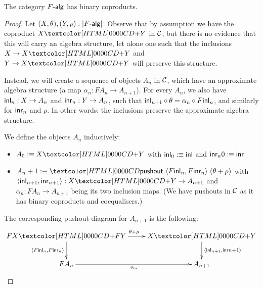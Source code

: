 \begin{proposition}
  The category $\algcat{F}$ has binary coproducts.
\end{proposition}

\begin{proof}
  Let $(X,\theta),(Y,\rho) : | \algcat{F} |$. Observe that by
  assumption we have the coproduct $\coproduct{X}{Y}$ in $\mathcal{C}$, but there is no
  evidence that this will carry an algebra structure, let alone one
  such that the inclusions $X \to \coproduct{X}{Y}$ and $Y \to \coproduct{X}{Y}$ will
  preserve this structure.

  Instead, we will create a sequence of objects $A_n$ in $\mathcal{C}$, which
  have an approximate algebra structure (a map
  $\alpha_n : FA_n \to A_{n+1}$). For every $A_n$, we also have
  $\inln{n} : X \to A_n$ and $\inrn{n} : Y \to A_n$, such that
  $\inln{n+1} \circ \theta = \alpha_n \circ F \inl_{n}$, and similarly
  for $\inrn{n}$ and $\rho$. In other words: the inclusions preserve
  the approximate algebra structure.

  We define the objects $A_n$ inductively:
  \begin{itemize}
  \item $A_0 \ddefeq \coproduct{X}{Y}$ with $\inln{0} \ddefeq \ident{inl}$ and $\inrn{n}{0} \ddefeq \ident{inr}$
  \item
    $A_n+1 \ddefeq \pushout{\langle F \inln{n}, F \inrn{n}
      \rangle}{(\theta + \rho)}$
    with
    $\langle \inln{n+1}, \inrn{n+1} \rangle : \coproduct{X}{Y} \to
    A_{n+1}$
    and $\alpha_n : FA_n \to A_{n+1}$ being its two inclusion
    maps. (We have pushouts in $\mathcal{C}$ as it has binary coproducts and
    coequalisers.)
  \end{itemize}

  The corresponding pushout diagram for $A_{n+1}$ is the following:
  $$
  \xymatrix{
    \coproduct{FX}{FY} \ar[r]^{\theta + \rho} \ar[d]_{\langle F \inln{n} , F \inrn{n} \rangle} 
    &\coproduct{X}{Y} \ar[d]^{\langle \inln{n+1} , \inr{n+1} \rangle} \\
    FA_n \ar[r]_{\alpha_n}
    &A_{n+1}
  }
  $$


\end{proof}
